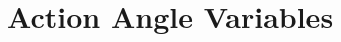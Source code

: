 \documentclass[../sands-adaptation.tex]{subfiles}
\begin{document}
\section{Action Angle Variables} \label{sec:2.8}
\end{document}
